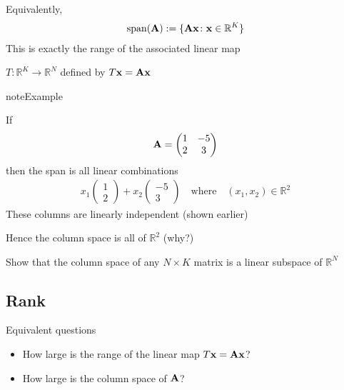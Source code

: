 \documentclass[letterpaper,10pt,english]{jupyterBook}
\begin{document}
\sphinxAtStartPar
Equivalently,
\begin{equation*}
\begin{split}
%
\mathrm{span}({\bf A}) := \{ {\bf A}{\bf x } \colon {\bf x} \in \mathbb{R}^K \}
%
\end{split}
\end{equation*}
\sphinxAtStartPar
This is exactly the range of the associated linear map

\sphinxAtStartPar
\(T \colon \mathbb{R}^K \to \mathbb{R}^N\) defined by \(T {\bf x} = {\bf A} {\bf x}\)

\begin{sphinxadmonition}{note}{Example}

\sphinxAtStartPar
If
\begin{equation*}
\begin{split}
%
{\bf A} =
\begin{pmatrix}
1 & -5 \\
2 & 3
\end{pmatrix}
%
\end{split}
\end{equation*}
\sphinxAtStartPar
then the span is all linear combinations
\begin{equation*}
\begin{split}
%
x_1
\left(
\begin{array}{c}
1 \\
2
\end{array}
\right)
+ 
x_2
\left(
\begin{array}{c}
-5 \\
3
\end{array}
\right)
\quad
\text{where}
\quad
(x_1, x_2) \in \mathbb{R}^2
%
\end{split}
\end{equation*}
\sphinxAtStartPar
These columns are linearly independent (shown earlier)

\sphinxAtStartPar
Hence the column space is all of \(\mathbb{R}^2\) (why?)
\end{sphinxadmonition}

\sphinxAtStartPar
{} Show that the column space of any \(N \times K\) matrix is a linear
subspace of \(\mathbb{R}^N\)


\subsection{Rank}
\label{\detokenize{05.linear_algebra:rank}}
\sphinxAtStartPar
Equivalent questions
\begin{itemize}
\item {} 
\sphinxAtStartPar
How large is the range of the linear map \(T {\bf x} = {\bf A} {\bf x}\)?

\item {} 
\sphinxAtStartPar
How large is the column space of \({\bf A}\)?

\end{itemize}
\end{document}
